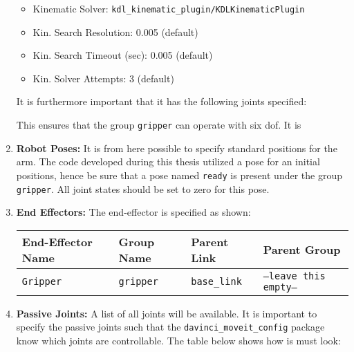 \begin{enumerate}
\begin{itemize}
\item Kinematic Solver: \texttt{kdl\_kinematic\_plugin/KDLKinematicPlugin}
\item Kin. Search Resolution: 0.005 (default)
\item Kin. Search Timeout (sec): 0.005 (default)
\item Kin. Solver Attempts: 3 (default)
\end{itemize}
It is furthermore important that it has the following joints specified:
\renewcommand*\DTstylecomment{\rmfamily\color{gray}\textsc}
\renewcommand*\DTstyle{\ttfamily\textcolor{black}} 
\begin{figure}[H]
\end{figure}
This ensures that the group \texttt{gripper} can operate with six \gls{dof}. It is 
\item \textbf{Robot Poses:} It is from here possible to specify standard positions for the arm. The code developed during this thesis utilized a pose for an initial positions, hence be sure that a pose named \texttt{ready} is present under the group \texttt{gripper}. All joint states should be set to zero for this pose.
\item \textbf{End Effectors:} The end-effector is specified as shown:
\begin{table}[H]
\hspace{1cm}\begin{tabular}{l|l|l|l}
\textbf{End-Effector Name} & \textbf{Group Name}  & \textbf{Parent Link}  & \textbf{Parent Group}   \\
\hline
 \texttt{Gripper} & \texttt{gripper}  & \texttt{base\_link}  &  \texttt{--leave this empty--} \\
\end{tabular}
\end{table}
\item \textbf{Passive Joints:} A list of all joints will be available. It is important to specify the passive joints such that the \texttt{davinci\_moveit\_config} package know which joints are controllable. The table below shows how is must look:

\end{enumerate}
